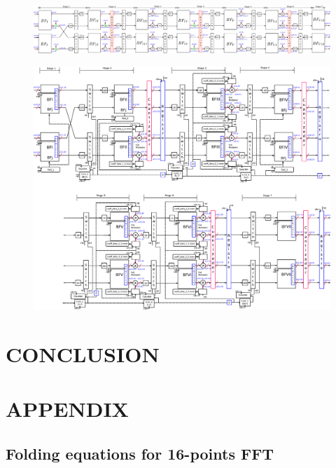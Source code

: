\documentclass[journal,comsoc]{IEEEtran}
\begin{document}
\begin{figure}[htbp]
	\centering
	\includegraphics[width=\linewidth]{Diagramas/miSeccionFiguras/4Paralelo128pRadix8Cuantizacion1}
	\caption{}
	\label{fig:4paralelo128pradix8cuantizacion1}
\end{figure}
\begin{figure}[htbp]%
	\centering
	\includegraphics[width=\linewidth]{Diagramas/V5_esquema_p.eps} 
\end{figure}

\section{CONCLUSION}
\section*{APPENDIX}
\subsection{Folding equations for 16-points FFT}
\end{document}
